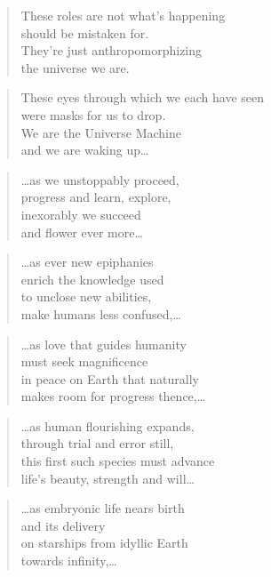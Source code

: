 \documentclass[14pt,a4paper]{article}
\begin{document}
\begin{verse}
These roles are not what’s happening\\
should be mistaken for.\\
They’re just anthropomorphizing\\
the universe we are.
\end{verse}

\begin{verse}
These eyes through which we each have seen\\
were masks for us to drop.\\
We are the Universe Machine\\
and we are waking up…
\end{verse}

\begin{verse}
…as we unstoppably proceed,\\
progress and learn, explore,\\
inexorably we succeed\\
and flower ever more…
\end{verse}

\begin{verse}
…as ever new epiphanies\\
enrich the knowledge used\\
to unclose new abilities,\\
make humans less confused,…
\end{verse}

\begin{verse}
…as love that guides humanity\\
must seek magnificence\\
in peace on Earth that naturally\\
makes room for progress thence,…
\end{verse}

\begin{verse}
…as human flourishing expands,\\
through trial and error still,\\
this first such species must advance\\
life’s beauty, strength and will…
\end{verse}

\begin{verse}
…as embryonic life nears birth\\
and its delivery\\
on starships from idyllic Earth\\
towards infinity,…
\end{verse}
\end{document}
